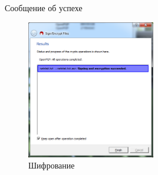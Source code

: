 Сообщение об успехе
\begin{figure}[!ht]
	\centering
	\includegraphics[width=0.5\textwidth]{images/13.png}
	\caption{Шифрование}
\end{figure}

